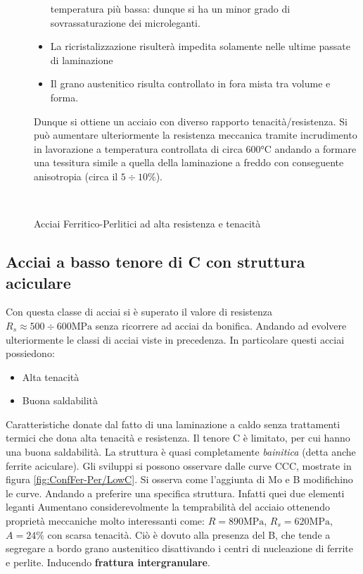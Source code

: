 \begin{description}
\begin{itemize}
	temperatura più bassa: dunque si ha un minor grado di sovrassaturazione dei microleganti.
	\item La ricristalizzazione risulterà impedita solamente nelle ultime passate di laminazione
	\item Il grano austenitico risulta controllato in fora mista tra volume e forma.
	\end{itemize}
Dunque si ottiene un acciaio con diverso rapporto tenacità/resistenza.
Si può aumentare ulteriormente la resistenza meccanica tramite incrudimento in
lavorazione a temperatura controllata di circa $600\unit{\celsius}$ andando a formare
una tessitura simile a quella della laminazione a freddo con conseguente anisotropia 
(circa il $5 \div 10\%$).
\end{description}

\begin{figure}
\centering
{}\quad
{}\\
\caption{Acciai Ferritico-Perlitici ad alta resistenza e tenacità}
\label{fig:FerPerHSHR}
\end{figure}

\newpage
\subsection{Acciai a basso tenore di C con struttura aciculare}
Con questa classe di acciai si è superato il valore di resistenza $R_s \approx 500 \div 600\unit{\MPa}$
senza ricorrere ad acciai da bonifica. Andando ad evolvere ulteriormente le classi
di acciai viste in precedenza.
In particolare questi acciai possiedono:
\begin{itemize}
\item Alta tenacità
\item Buona saldabilità
\end{itemize}
Caratteristiche donate dal fatto di una laminazione a caldo senza trattamenti termici che dona
alta tenacità e resistenza. Il tenore C è limitato, per cui hanno una buona saldabilità.
La struttura è quasi completamente \textit{bainitica}  (detta anche ferrite aciculare). 
Gli sviluppi si possono osservare dalle curve CCC, mostrate in figura \ref{fig:ConfFer-Per/LowC}.
Si osserva come l'aggiunta di Mo e B modifichino le curve. Andando a preferire una 
specifica struttura.
Infatti quei due elementi leganti Aumentano considerevolmente la temprabilità del acciaio ottenendo
proprietà meccaniche molto interessanti come: $R = 890\unit{\MPa}$, $R_s = 620\unit{\MPa}$, $A = 24\%$
con scarsa tenacità.
Ciò è dovuto alla presenza del B, che tende a segregare a bordo grano austenitico disattivando i centri 
di nucleazione di ferrite e perlite. Inducendo \textbf{frattura intergranulare}.


